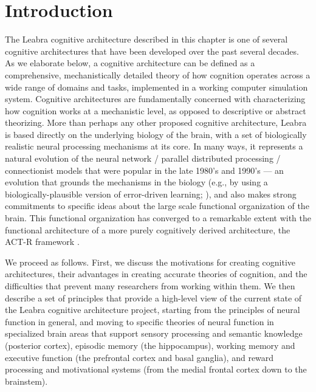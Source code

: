 \documentclass[11pt,twoside]{article}
\begin{document}
 
\titlesamepageoc{\mytitle}{\myauthor}{\mynote}{\myabstract}



\pagestyle{myheadings}

\section{Introduction}

The Leabra cognitive architecture described in this chapter is one of several
cognitive architectures that have been developed over the past several
decades.  As we elaborate below, a cognitive architecture can be defined as a
comprehensive, mechanistically detailed theory of how cognition operates
across a wide range of domains and tasks, implemented in a working
computer simulation system.  Cognitive architectures are fundamentally
concerned with characterizing how cognition works at a mechanistic level, as
opposed to descriptive or abstract theorizing.  More than perhaps any other
proposed cognitive architecture, Leabra is based directly on the underlying
biology of the brain, with a set of biologically realistic neural processing
mechanisms at its core.  In many ways, it represents a natural evolution of
the neural network / parallel distributed processing / connectionist models
that were popular in the late 1980's and 1990's --- an evolution that grounds
the mechanisms in the biology (e.g., by using a biologically-plausible version
of error-driven learning; ), and
also makes strong commitments to specific ideas about the large scale
functional organization of the brain.  This functional organization has
converged to a remarkable extent with the functional architecture of a more
purely cognitively derived architecture, the ACT-R framework
\cite{AndersonBothellByrneEtAl04}.

We proceed as follows.  First, we discuss the motivations for creating
cognitive architectures, their advantages in creating accurate theories of
cognition, and the difficulties that prevent many researchers from working
within them.  We then describe a set of principles that provide a high-level
view of the current state of the Leabra cognitive architecture project,
starting from the principles of neural function in general, and moving to
specific theories of neural function in specialized brain areas that support
sensory processing and semantic knowledge (posterior cortex), episodic memory
(the hippocampus), working memory and executive function (the prefrontal
cortex and basal ganglia), and reward processing and motivational systems
(from the medial frontal cortex down to the brainstem).
\end{document}
